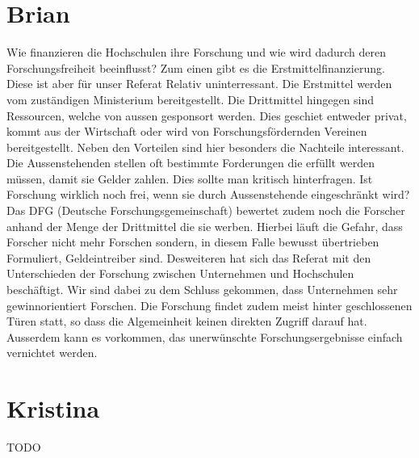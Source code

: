 \documentclass{pmwk}
\begin{document}
\section*{Brian}
Wie finanzieren die Hochschulen ihre Forschung und wie wird dadurch deren Forschungsfreiheit beeinflusst? Zum einen gibt es die Erstmittelfinanzierung. Diese ist aber für unser Referat Relativ uninterressant. Die Erstmittel werden vom zuständigen Ministerium bereitgestellt. Die Drittmittel hingegen sind Ressourcen, welche von aussen gesponsort werden. Dies geschiet entweder privat, kommt aus der Wirtschaft oder wird von Forschungsfördernden Vereinen bereitgestellt. Neben den Vorteilen sind hier besonders die Nachteile interessant. Die Aussenstehenden stellen oft bestimmte Forderungen die erfüllt werden müssen, damit sie Gelder zahlen. Dies sollte man kritisch hinterfragen. Ist Forschung wirklich noch frei, wenn sie durch Aussenstehende eingeschränkt wird? Das DFG (Deutsche Forschungsgemeinschaft) bewertet zudem noch die Forscher anhand der Menge der Drittmittel die sie werben. Hierbei läuft die Gefahr, dass Forscher nicht mehr Forschen sondern, in diesem Falle bewusst übertrieben Formuliert, Geldeintreiber sind. Desweiteren hat sich das Referat mit den Unterschieden der Forschung zwischen Unternehmen und Hochschulen beschäftigt. Wir sind dabei zu dem Schluss gekommen, dass Unternehmen sehr gewinnorientiert Forschen. Die Forschung findet zudem meist hinter geschlossenen Türen statt, so dass die Algemeinheit keinen direkten Zugriff darauf hat. Ausserdem kann es vorkommen, das unerwünschte Forschungsergebnisse einfach vernichtet werden.

\section*{Kristina}
TODO
\end{document}
